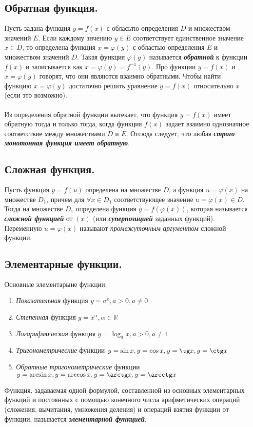 \documentclass[12pt, fleqn]{article}
\begin{document}
	\subsection{Обратная функция.}
	Пусть задана функция $y=f(x)$ с обласьтю определения $D$ и множеством значений $E$. Если каждому знчению $y\in E$ соответствует единственное значение $x\in D$, то определена функция $x = \varphi(y)$ с областью определения $E$ и множеством значений $D$. Такая функция $\varphi(y)$ называется \textbf{\textit{обратной}} к функции $f(x)$ и записывается как $x=\varphi(y)=f^{-1}(y)$. Про функции $y=f(x)$ и $x=\varphi(y)$ говорят, что они являются взаимно обратными. Чтобы найти функцию $x=\varphi(y)$ достаточно решить уравнение $y=f(x)$ относительно $x$ (если это возможно).\\\\
	Из определения обратной функции вытекает, что функция $y=f(x)$ имеет обратную тогда и только тогда, когда функция $f(x)$ задает взаимно однозначное соответствие между множествами $D$ и $E$. Отсюда следует, что любая \textbf{\textit{строго монотонная функция имеет обратную}}.
	\subsection{Сложная функция.}
	Пусть функция $y=f(u)$ определена на множестве $D$, а функция $u=\varphi(x)$ на множестве $D_1$, причем для $\forall x \in D_1$ соответствующее значение $u=\varphi(x) \in D$. Тогда на множестве $D_1$ определена функция $y=f(\varphi(x))$, которая называется \textbf{\textit{сложной функцией}} от $(x)$ (или \textbf{\textit{суперпозицией}} заданных функций).\\
	Переменную $u=\varphi(x)$ называют \textit{промежуточным аргументом} сложной функции.
	\subsection{Элементарные функции.}
	Основные элементарыне функции: 
	\begin{enumerate}
		\item \textit{Показательная} функция $y=a^x, a>0, a\neq0$
		\item \textit{Степенная} функция $y=x^\alpha, \alpha \in \mathbb{R}$
		\item \textit{Логарифмическая} функция $y=\log_{a}x, a > 0, a \neq 1$
		\item \textit{Тригонометрические }функции $y=\sin x, y=\cos x, y=\tg x, y =\ctg x$
		\item \textit{Обратные тригонометрические }функции $y=\arcsin x, y=\arccos x, y=\arctg x, y =\arcctg x$
	\end{enumerate}
	Функция, задаваемая одной формулой, составленной из основных элементарных функций и постоянных с помощью конечного числа арифметических операций (сложения, вычитания, умножения деления) и операций взятия функции от функции, называется \textbf{\textit{элементарной функцией}}.
\end{document}

